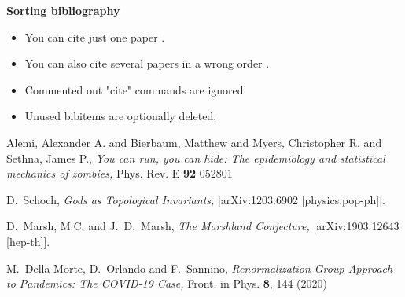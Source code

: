 \documentclass{article}
\begin{document}
\begin{center}
	\Large \bf Sorting bibliography
\end{center}

\begin{itemize}
\item You can cite just one paper \cite{Marsh:2019lhu}.
\item You can also cite several papers in a wrong order \cite{DellaMorte:2020wlc,Marsh:2019lhu,Schoch:2012xh}.
\item Commented out "cite" commands are ignored %
\item Unused bibitems are optionally deleted.
\end{itemize}





\begin{thebibliography}{99}





Alemi, Alexander A. and Bierbaum, Matthew and Myers, Christopher R. and Sethna, James P.,
{\em You can run, you can hide: The epidemiology and statistical mechanics of zombies,}
Phys. Rev. E \textbf{92} 052801


D.~Schoch,
{\em Gods as Topological Invariants,}
[arXiv:1203.6902 [physics.pop-ph]].


D.~Marsh, M.C. and J.~D.~Marsh,
{\em The Marshland Conjecture,}
[arXiv:1903.12643 [hep-th]].



M.~Della Morte, D.~Orlando and F.~Sannino,
{\em Renormalization Group Approach to Pandemics: The COVID-19 Case,}
Front. in Phys. \textbf{8}, 144 (2020)


\end{thebibliography}
\end{document}
